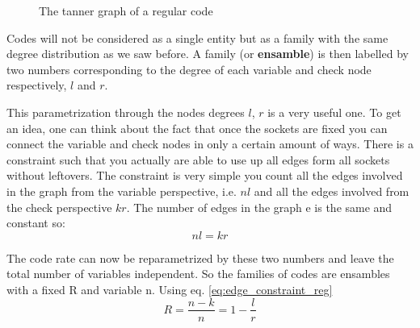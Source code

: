 \begin{figure}[h]
\begin{center}
	\end{center}
	\caption{The tanner graph of a regular code}
	\label{fig:TannerRegular}
\end{figure}
Codes will not be considered as a single entity but as a family with the same degree distribution as we saw before. A family (or \textbf{ ensamble}) is then labelled by two numbers corresponding to the degree of each variable and check node respectively, $l$ and $r$. 

This parametrization through the nodes degrees $l$, $r$ is a very useful one. To get an idea, one can think about the fact that once the sockets are fixed you can connect the variable and check nodes in only a certain amount of ways. There is a constraint such that you actually are able to use up all edges form all sockets without leftovers. The constraint is very simple you count all the edges involved in the graph from the variable perspective, i.e. $nl$ and all the edges involved from the check perspective $kr$. The number of edges in the graph e is the same and constant so:
\begin{equation} 
	nl = kr
\label{eq:edge_constraint_reg}
\end{equation} 

The code rate can now be reparametrized by these two numbers and leave the total number of variables independent. So the families of codes are ensambles with a fixed R and variable n.
Using eq. \ref{eq:edge_constraint_reg}
\begin{equation}
	R = \frac{n-k}{n} = 1 -\frac{l}{r}
\end{equation} 

